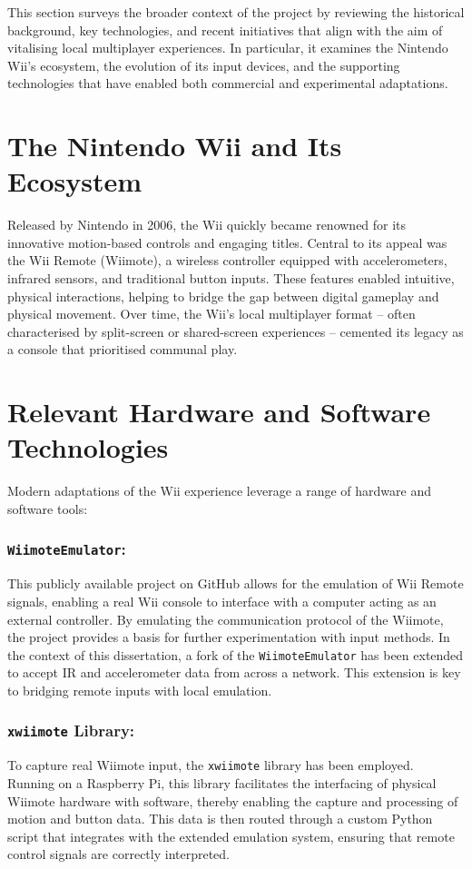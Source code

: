 \label{chapter:context}

This section surveys the broader context of the project by reviewing the historical background, key technologies, and recent initiatives that align with the aim of vitalising local multiplayer experiences. In particular, it examines the Nintendo Wii’s ecosystem, the evolution of its input devices, and the supporting technologies that have enabled both commercial and experimental adaptations.

\section{The Nintendo Wii and Its Ecosystem}
Released by Nintendo in 2006, the Wii quickly became renowned for its innovative motion-based controls and engaging titles. Central to its appeal was the Wii Remote (Wiimote), a wireless controller equipped with accelerometers, infrared sensors, and traditional button inputs. These features enabled intuitive, physical interactions, helping to bridge the gap between digital gameplay and physical movement. Over time, the Wii’s local multiplayer format -- often characterised by split-screen or shared-screen experiences -- cemented its legacy as a console that prioritised communal play.

\section{Relevant Hardware and Software Technologies}
Modern adaptations of the Wii experience leverage a range of hardware and software tools:

\subsubsection{\texttt{WiimoteEmulator}\cite{wiimote_emulator}:} This publicly available project on GitHub allows for the emulation of Wii Remote signals, enabling a real Wii console to interface with a computer acting as an external controller. By emulating the communication protocol of the Wiimote, the project provides a basis for further experimentation with input methods. In the context of this dissertation, a fork of the \texttt{WiimoteEmulator} has been extended to accept IR and accelerometer data from across a network. This extension is key to bridging remote inputs with local emulation.

\subsubsection{\texttt{xwiimote} Library\cite{xwiimote}:} To capture real Wiimote input, the \texttt{xwiimote} library has been employed. Running on a Raspberry Pi, this library facilitates the interfacing of physical Wiimote hardware with software, thereby enabling the capture and processing of motion and button data. This data is then routed through a custom Python script that integrates with the extended emulation system, ensuring that remote control signals are correctly interpreted.

